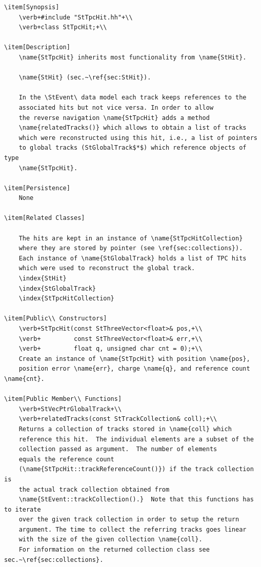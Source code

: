 \begin{enumerate}
\begin{Entry}
\begin{Entry}
{\begin{verbatim}
\item[Synopsis]
    \verb+#include "StTpcHit.hh"+\\
    \verb+class StTpcHit;+\\

\item[Description]
    \name{StTpcHit} inherits most functionality from \name{StHit}.
    
    \name{StHit} (sec.~\ref{sec:StHit}).

    In the \StEvent\ data model each track keeps references to the
    associated hits but not vice versa. In order to allow
    the reverse navigation \name{StTpcHit} adds a method
    \name{relatedTracks()} which allows to obtain a list of tracks
    which were reconstructed using this hit, i.e., a list of pointers
    to global tracks (StGlobalTrack$*$) which reference objects of type
    \name{StTpcHit}.

\item[Persistence]
    None

\item[Related Classes]
    
    The hits are kept in an instance of \name{StTpcHitCollection}
    where they are stored by pointer (see \ref{sec:collections}).
    Each instance of \name{StGlobalTrack} holds a list of TPC hits
    which were used to reconstruct the global track.
    \index{StHit}
    \index{StGlobalTrack}
    \index{StTpcHitCollection}

\item[Public\\ Constructors]
    \verb+StTpcHit(const StThreeVector<float>& pos,+\\
    \verb+         const StThreeVector<float>& err,+\\
    \verb+         float q, unsigned char cnt = 0);+\\
    Create an instance of \name{StTpcHit} with position \name{pos},
    position error \name{err}, charge \name{q}, and reference count \name{cnt}.

\item[Public Member\\ Functions]
    \verb+StVecPtrGlobalTrack+\\
    \verb+relatedTracks(const StTrackCollection& coll);+\\
    Returns a collection of tracks stored in \name{coll} which
    reference this hit.  The individual elements are a subset of the
    collection passed as argument.  The number of elements
    equals the reference count
    (\name{StTpcHit::trackReferenceCount()}) if the track collection is
    the actual track collection obtained from
    \name{StEvent::trackCollection().}  Note that this functions has to iterate
    over the given track collection in order to setup the return
    argument. The time to collect the referring tracks goes linear
    with the size of the given collection \name{coll}.
    For information on the returned collection class see sec.~\ref{sec:collections}.


\end{verbatim}}
\end{Entry}
\end{Entry}
\end{enumerate}
